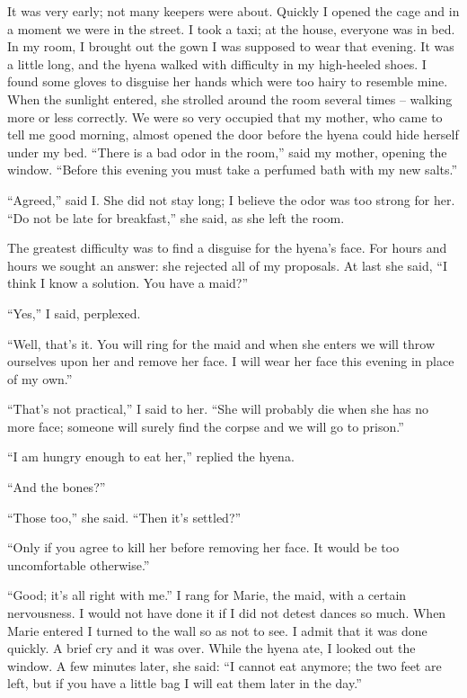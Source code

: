 \documentclass[10pt,a4paper]{article}
\begin{document}
It was very early; not many keepers were about. Quickly I opened the cage and in a moment we were in the street. I took a taxi; at the house, everyone was in bed. In my room, I brought out the gown I was supposed to wear that evening. It was a little long, and the hyena walked with difficulty in my high-heeled shoes. I found some gloves to disguise her hands which were too hairy to resemble mine. When the sunlight entered, she strolled around the room several times – walking more or less correctly. We were so very occupied that my mother, who came to tell me good morning, almost opened the door before the hyena could hide herself under my bed. “There is a bad odor in the room,” said my mother, opening the window. “Before this evening you must take a perfumed bath with my new salts.”

“Agreed,” said I. She did not stay long; I believe the odor was too strong for her. “Do not be late for breakfast,” she said, as she left the room.

The greatest difficulty was to find a disguise for the hyena’s face. For hours and hours we sought an answer: she rejected all of my proposals. At last she said, “I think I know a solution. You have a maid?”

“Yes,” I said, perplexed.

“Well, that’s it. You will ring for the maid and when she enters we will throw ourselves upon her and remove her face. I will wear her face this evening in place of my own.”

“That’s not practical,” I said to her. “She will probably die when she has no more face; someone will surely find the corpse and we will go to prison.”

“I am hungry enough to eat her,” replied the hyena.

“And the bones?”

“Those too,” she said. “Then it’s settled?”

“Only if you agree to kill her before removing her face. It would be too uncomfortable otherwise.”

“Good; it’s all right with me.” I rang for Marie, the maid, with a certain nervousness. I would not have done it if I did not detest dances so much. When Marie entered I turned to the wall so as not to see. I admit that it was done quickly. A brief cry and it was over. While the hyena ate, I looked out the window. A few minutes later, she said: “I cannot eat anymore; the two feet are left, but if you have a little bag I will eat them later in the day.”
\end{document}
